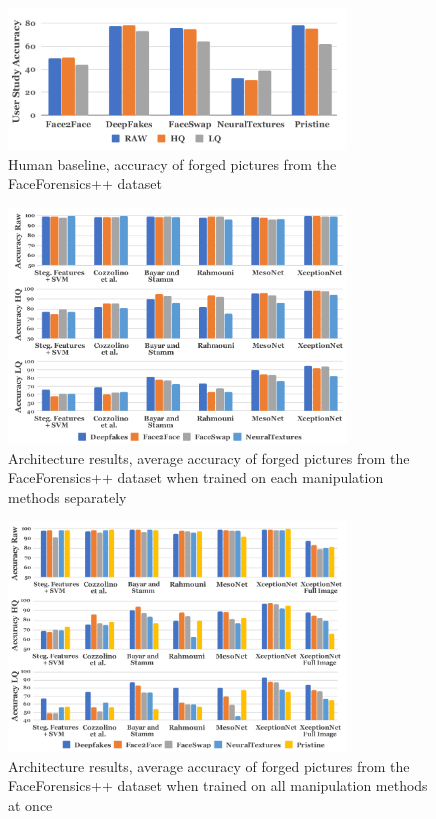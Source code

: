 \documentclass{article} %
\begin{document}
\begin{figure}[H]
\begin{center}
\includegraphics[width=0.8\textwidth]{images/human.png}
\end{center}
\caption{Human baseline, accuracy of forged pictures from the FaceForensics++ dataset}
\end{figure}

\begin{figure}[H]
\begin{center}
\includegraphics[width=0.8\textwidth]{images/single.png}
\end{center}
\caption{Architecture results, average accuracy of forged pictures from the FaceForensics++ dataset when trained on each manipulation methods separately}
\end{figure}

\begin{figure}[H]
\begin{center}
\includegraphics[width=0.8\textwidth]{images/multi.png}
\end{center}
\caption{Architecture results, average accuracy of forged pictures from the FaceForensics++ dataset when trained on all manipulation methods at once}
\end{figure}
\end{document}
